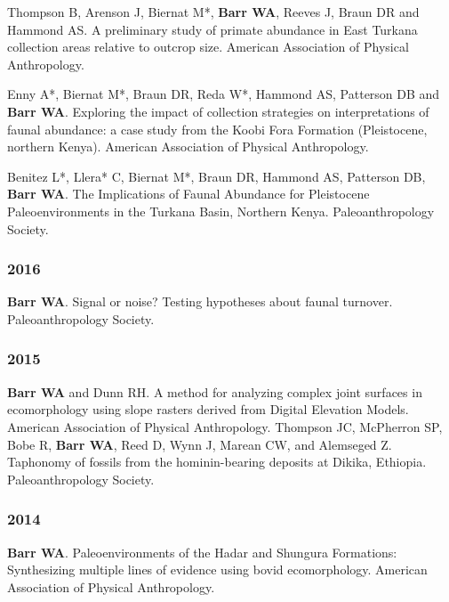 \documentclass{article}
\begin{document}
\begin{etaremune}
\item Thompson B, Arenson J, Biernat M*,  {\bfseries Barr WA}, Reeves J, Braun DR and Hammond AS. A preliminary study of primate abundance in East Turkana collection areas relative to outcrop size. American Association of Physical Anthropology.

\item Enny A*, Biernat M*, Braun DR, Reda W*, Hammond AS, Patterson DB and {\bfseries Barr WA}. Exploring the impact of collection strategies on interpretations of faunal abundance: a case study from the Koobi Fora Formation (Pleistocene, northern Kenya). American Association of Physical Anthropology.

\item Benitez L*, Llera* C, Biernat M*, Braun DR, Hammond AS, Patterson DB, {\bfseries Barr WA}. The Implications of Faunal Abundance for Pleistocene Paleoenvironments in the Turkana Basin, Northern Kenya. Paleoanthropology Society. 

\subsubsection*{2016}

\item {\bfseries Barr WA}. Signal or noise? Testing hypotheses about faunal turnover. Paleoanthropology Society. 

\subsubsection*{2015}

\item {\bfseries Barr WA} and Dunn RH. A method for analyzing complex joint surfaces in ecomorphology using slope rasters derived from Digital Elevation Models. American Association of Physical Anthropology.
Thompson JC, McPherron SP, Bobe R, {\bfseries Barr WA}, Reed D, Wynn J, Marean CW, and Alemseged Z. Taphonomy of fossils from the hominin-bearing deposits at Dikika, Ethiopia. Paleoanthropology Society.

\subsubsection*{2014}

\item {\bfseries Barr WA}. Paleoenvironments of the Hadar and Shungura Formations: Synthesizing multiple lines of evidence using bovid ecomorphology. American Association of Physical Anthropology.


\end{etaremune}
\end{document}
